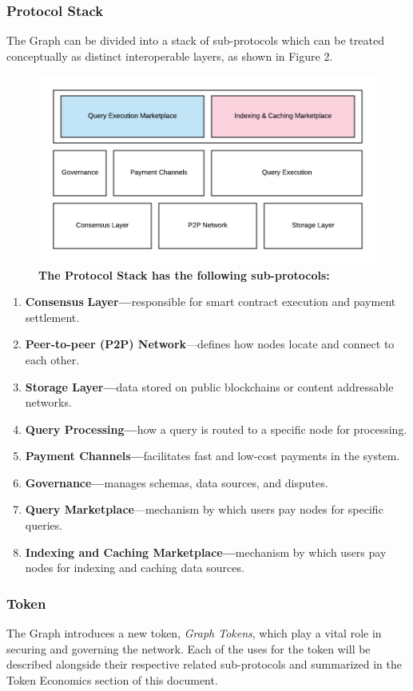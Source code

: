 \documentclass[12pt]{article}
\begin{document}
\subsubsection*{Protocol Stack}
The Graph can be divided into a stack of sub-protocols which can be treated conceptually as distinct interoperable layers, as shown in Figure 2.
\begin{figure}[H]
\vspace*{5mm}
\caption{\textbf{The Protocol Stack has the following sub-protocols:}}
\begin{center}
\includegraphics[width=.9\textwidth]{media/image7.png}
\end{center}
\end{figure}
\begin{enumerate}
\item \textbf{Consensus} \textbf{Layer---}responsible for smart contract execution and payment settlement.
\item \textbf{Peer-to-peer (P2P) Network}---defines how nodes locate and connect to each other.
\item \textbf{Storage Layer---}data stored on public blockchains or content addressable networks.
\item \textbf{Query Processing---}how a query is routed to a specific node for processing.
\item \textbf{Payment Channels---}facilitates fast and low-cost payments in the system.
\item \textbf{Governance---}manages schemas, data sources, and disputes.
\item \textbf{Query Marketplace}---mechanism by which users pay nodes for specific queries.
\item \textbf{Indexing and Caching Marketplace---}mechanism by which users pay nodes for indexing and caching data sources.
\end{enumerate}
\subsubsection*{Token}
The Graph introduces a new token, \textit{Graph Tokens}, which play a vital role in securing and governing the network. Each of the uses for the token will be described alongside their respective related sub-protocols and summarized in the Token Economics section of this document.
\end{document}
